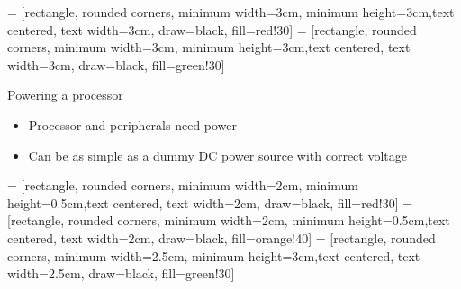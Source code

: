 \documentclass[10pt]{beamer}
\begin{document}
 = [rectangle, rounded corners, minimum width=3cm, minimum height=3cm,text centered, text width=3cm, draw=black, fill=red!30]
 = [rectangle, rounded corners, minimum width=3cm, minimum height=3cm,text centered, text width=3cm, draw=black, fill=green!30]

\begin{frame}[t]{Powering a processor}\vspace{4pt}

\begin{itemize}
	\item Processor and peripherals need power
	\item Can be as simple as a dummy DC power source with correct voltage
\end{itemize}


\vfill
\centering
\begin{minipage}[c]{.75\textwidth}

\end{minipage}
\end{frame}


 = [rectangle, rounded corners, minimum width=2cm, minimum height=0.5cm,text centered, text width=2cm, draw=black, fill=red!30]
 = [rectangle, rounded corners, minimum width=2cm, minimum height=0.5cm,text centered, text width=2cm, draw=black, fill=orange!40]
 = [rectangle, rounded corners, minimum width=2.5cm, minimum height=3cm,text centered, text width=2.5cm, draw=black, fill=green!30]
\end{document}
